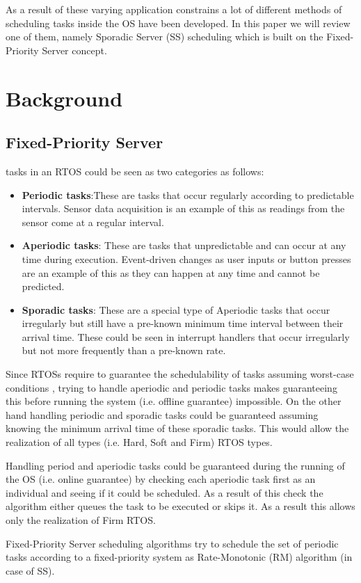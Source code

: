 \documentclass[conference]{IEEEtran}
\begin{document}
As a result of these varying application constrains a lot of different methods of scheduling tasks inside the OS have been developed. In this paper we will review one of them, namely Sporadic Server (SS) scheduling which is built on the Fixed-Priority Server concept.
\section{Background}
\subsection{Fixed-Priority Server}
tasks in an RTOS could be seen as two categories as follows:
\begin{itemize}
    \item \textbf{Periodic tasks}:These are tasks that occur regularly according to predictable intervals. Sensor data acquisition is an example of this as readings from the sensor come at a regular interval.
    \item \textbf{Aperiodic tasks}: These are tasks that unpredictable and can occur at any time during execution. Event-driven changes as user inputs or button presses are an example of this as they can happen at any time and cannot be predicted.
    \item \textbf{Sporadic tasks}: These are a special type of Aperiodic tasks that occur irregularly but still have a pre-known minimum time interval between their arrival time. These could be seen in interrupt handlers that occur irregularly but not more frequently than a pre-known rate.
\end{itemize}
Since RTOSs require to guarantee the schedulability of tasks assuming worst-case conditions \cite{rtosbehaviour}, trying to handle aperiodic and periodic tasks makes guaranteeing this before running the system (i.e. offline guarantee) impossible. On the other hand handling periodic and sporadic tasks could be guaranteed assuming knowing the minimum arrival time of these sporadic tasks. This would allow the realization of all types (i.e. Hard, Soft and Firm) RTOS types.

Handling period and aperiodic tasks could be guaranteed during the running of the OS (i.e. online guarantee) by checking each aperiodic task first as an individual and seeing if it could be scheduled. As a result of this check the algorithm either queues the task to be executed or skips it. As a result this allows only the realization of Firm RTOS.

Fixed-Priority Server scheduling algorithms try to schedule the set of periodic tasks according to a fixed-priority system as Rate-Monotonic (RM) algorithm (in case of SS).
\end{document}
